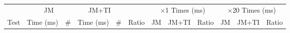 \begin{figure*}
\begin{center}
\begin{tabular}{lr@{.}lrr@{.}lrr@{.}lr@{.}lr@{.}lr@{.}lr@{.}lr@{.}lr@{.}l}

\toprule

           & \multicolumn{3}{c}{JM}
           & \multicolumn{3}{c}{JM+TI}
           & \multicolumn{2}{c}{}
           & \multicolumn{6}{c}{$\times$1 Times (ms)}
           & \multicolumn{6}{c}{$\times$20 Times (ms)} \\

\cmidrule(r){2-4}
\cmidrule{5-7}
\cmidrule(r){10-15}
\cmidrule{16-21}

Test       & \multicolumn{2}{c}{Time (ms)} & \#
           & \multicolumn{2}{c}{Time (ms)} & \#
           & \multicolumn{2}{c}{Ratio}
           & \multicolumn{2}{c}{JM}
           & \multicolumn{2}{c}{JM+TI}
           & \multicolumn{2}{c}{Ratio}
           & \multicolumn{2}{c}{JM}
           & \multicolumn{2}{c}{JM+TI}
           & \multicolumn{2}{c}{Ratio} \\

\midrule


\end{tabular}
\end{center}
\end{figure*}
